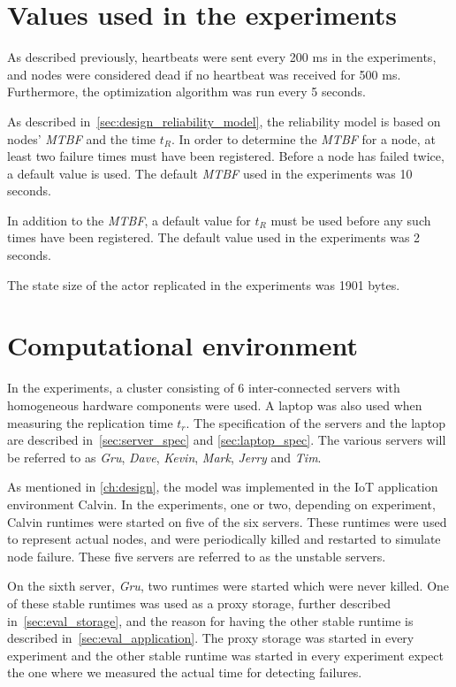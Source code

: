 \documentclass{cslthse-msc}
\begin{document}
\section{Values used in the experiments} \label{sec:eval_values}
As described previously, heartbeats were sent every 200 ms in the experiments, and nodes were considered dead if no heartbeat was received for 500 ms. Furthermore, the optimization algorithm was run every 5 seconds.

As described in~\cref{sec:design_reliability_model}, the reliability model is based on nodes' \emph{MTBF} and the time $t_R$. In order to determine the \emph{MTBF} for a node, at least two failure times must have been registered. Before a node has failed twice, a default value is used. The default \emph{MTBF} used in the experiments was 10 seconds.

In addition to the \emph{MTBF}, a default value for $t_R$ must be used before any such times have been registered. The default value used in the experiments was 2 seconds.

The state size of the actor replicated in the experiments was 1901 bytes.

\section{Computational environment} \label{sec:eval_comp_env}
In the experiments, a cluster consisting of 6 inter-connected servers with homogeneous hardware components were used. A laptop was also used when measuring the replication time $t_r$. The specification of the servers and the laptop are described in~\cref{sec:server_spec} and \cref{sec:laptop_spec}. The various servers will be referred to as \emph{Gru}, \emph{Dave}, \emph{Kevin}, \emph{Mark}, \emph{Jerry} and \emph{Tim}.

As mentioned in \cref{ch:design}, the model was implemented in the IoT application environment Calvin. In the experiments, one or two, depending on experiment, Calvin runtimes were started on five of the six servers. These runtimes were used to represent actual nodes, and were periodically killed and restarted to simulate node failure. These five servers are referred to as the unstable servers.

On the sixth server, \emph{Gru}, two runtimes were started which were never killed. One of these stable runtimes was used as a proxy storage, further described in~\cref{sec:eval_storage}, and the reason for having the other stable runtime is described in~\cref{sec:eval_application}. The proxy storage was started in every experiment and the other stable runtime was started in every experiment expect the one where we measured the actual time for detecting failures.
\end{document}
